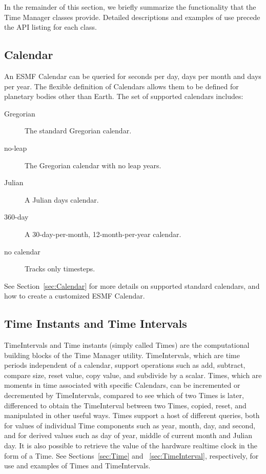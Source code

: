\newpage
In the remainder of this section, we briefly summarize the 
functionality that the Time Manager classes provide.  Detailed 
descriptions and examples of use precede the API listing for each 
class.

\subsection{Calendar}
An ESMF Calendar can be queried for seconds per day, days per month 
and days per year.  The flexible definition of Calendars allows them
to be defined for planetary bodies other than Earth.  The set of supported 
calendars includes:
\begin{description}
\item [Gregorian] The standard Gregorian calendar.
\item [no-leap] The Gregorian calendar with no leap years.
\item [Julian] A Julian days calendar.
\item [360-day] A 30-day-per-month, 12-month-per-year calendar.
\item [no calendar] Tracks only timesteps.
\end{description}
See Section~\ref{sec:Calendar} for more details on supported standard 
calendars, and how to create a customized ESMF Calendar.

\subsection{Time Instants and Time Intervals}

TimeIntervals and Time instants (simply called Times) are the computational 
building blocks of the Time Manager utility.  TimeIntervals, which are 
time periods independent of a calendar, support operations such as add, 
subtract, compare size, 
reset value, copy value, and subdivide by a scalar.  Times, which 
are moments in time associated with specific Calendars, can be incremented 
or decremented by TimeIntervals, compared to see which of two Times 
is later, differenced to obtain the TimeInterval between two Times, 
copied, reset, and manipulated in other useful ways.  Times support a 
host of different queries, both for values of individual Time 
components such as year, month, day, and second, and for derived values such 
as day of year, middle of current month and Julian day.  It is also possible 
to retrieve the value of the hardware realtime clock in the form of a 
Time.  See Sections~\ref{sec:Time} and ~\ref{sec:TimeInterval}, respectively,
for use and examples of Times and TimeIntervals.

